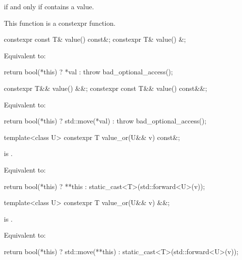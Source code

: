 \begin{itemdescr}
\pnum
\returns
{} if and only if  contains a value.

\pnum
\remarks
This function is a constexpr function.
\end{itemdescr}

%
\begin{itemdecl}
constexpr const T& value() const&;
constexpr T& value() &;
\end{itemdecl}

\begin{itemdescr}
\pnum
\effects
Equivalent to:
\begin{codeblock}
return bool(*this) ? *val : throw bad_optional_access();
\end{codeblock}
\end{itemdescr}

%
\begin{itemdecl}
constexpr T&& value() &&;
constexpr const T&& value() const&&;
\end{itemdecl}

\begin{itemdescr}

\pnum
\effects
Equivalent to:
\begin{codeblock}
return bool(*this) ? std::move(*val) : throw bad_optional_access();
\end{codeblock}
\end{itemdescr}

%
\begin{itemdecl}
template<class U> constexpr T value_or(U&& v) const&;
\end{itemdecl}

\begin{itemdescr}
\pnum
\mandates
{} is .

\pnum
\effects
Equivalent to:
\begin{codeblock}
return bool(*this) ? **this : static_cast<T>(std::forward<U>(v));
\end{codeblock}
\end{itemdescr}

%
\begin{itemdecl}
template<class U> constexpr T value_or(U&& v) &&;
\end{itemdecl}

\begin{itemdescr}
\pnum
\mandates
{} is .

\pnum
\effects
Equivalent to:
\begin{codeblock}
return bool(*this) ? std::move(**this) : static_cast<T>(std::forward<U>(v));
\end{codeblock}
\end{itemdescr}

